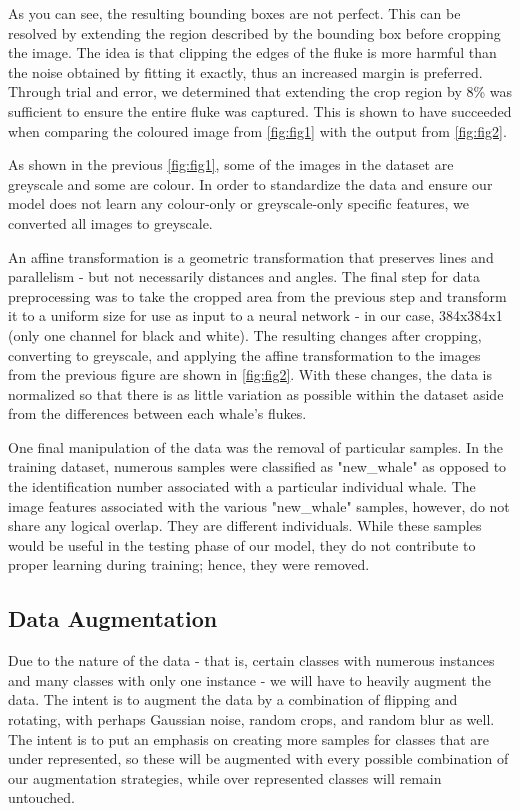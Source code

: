 \documentclass[paper=a4, fontsize=11pt]{scrartcl}
\numberwithin{equation}{section}		%
\numberwithin{table}{section}				%
\begin{document}
As you can see, the resulting bounding boxes are not perfect. This can be resolved by extending the region described by the bounding box before cropping the image. The idea is that clipping the edges of the fluke is more harmful than the noise obtained by fitting it exactly, thus an increased margin is preferred. Through trial and error, we determined that extending the crop region by 8\% was sufficient to ensure the entire fluke was captured. This is shown to have succeeded when comparing the coloured image from \autoref{fig:fig1} with the output from \autoref{fig:fig2}.

As shown in the previous \autoref{fig:fig1}, some of the images in the dataset are greyscale and some are colour. In order to standardize the data and ensure our model does not learn any colour-only or greyscale-only specific features, we converted all images to greyscale.

An affine transformation is a geometric transformation that preserves lines and parallelism - but not necessarily distances and angles. The final step for data preprocessing was to take the cropped area from the previous step and transform it to a uniform size for use as input to a neural network - in our case, 384x384x1 (only one channel for black and white). The resulting changes after cropping, converting to greyscale, and applying the affine transformation to the images from the previous figure are shown in \autoref{fig:fig2}. With these changes, the data is normalized so that there is as little variation as possible within the dataset aside from the differences between each whale's flukes.

One final manipulation of the data was the removal of particular samples. In the training dataset, numerous samples were classified as "new\_whale" as opposed to the identification number associated with a particular individual whale. The image features associated with the various "new\_whale" samples, however, do not share any logical overlap. They are different individuals. While these samples would be useful in the testing phase of our model, they do not contribute to proper learning during training; hence, they were removed.

\subsection{Data Augmentation}\label{subsec:Augmentation}
Due to the nature of the data - that is, certain classes with numerous instances and many classes with only one instance - we will have to heavily augment the data. The intent is to augment the data by a combination of flipping and rotating, with perhaps Gaussian noise, random crops, and random blur as well. The intent is to put an emphasis on creating more samples for classes that are under represented, so these will be augmented with every possible combination of our augmentation strategies, while over represented classes will remain untouched. 
\end{document}
